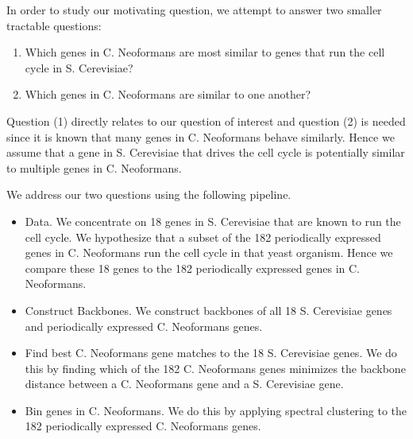 In order to study our motivating question, we attempt to answer two smaller tractable questions: 
\begin{enumerate}
\item Which genes in C. Neoformans are most similar to genes that run the cell cycle in S. Cerevisiae? 
\item Which genes in C. Neoformans are similar to one another? 
\end{enumerate}

Question (1) directly relates to our question of interest and question (2) is needed since it is known that many genes in C. Neoformans behave similarly. Hence we assume that a gene in S. Cerevisiae that drives the cell cycle is potentially similar to multiple genes in C. Neoformans. 

 We address our two questions using the following pipeline. 
\begin{itemize}
\item Data. We concentrate on 18 genes in S. Cerevisiae that are known to run the cell cycle. We hypothesize that a subset of the 182 periodically expressed genes in C. Neoformans run the cell cycle in that yeast organism. Hence we compare these 18 genes to the 182 periodically expressed genes in C. Neoformans.
\item Construct Backbones. We construct backbones of all 18 S. Cerevisiae genes and periodically expressed C. Neoformans genes. 
\item Find best C. Neoformans gene matches to the 18 S. Cerevisiae genes.  We do this by finding which of the 182 C. Neoformans genes minimizes the backbone distance between a C. Neoformans gene and a S. Cerevisiae gene.
\item Bin genes in C. Neoformans. We do this by applying spectral clustering to the 182 periodically expressed C. Neoformans genes.
\end{itemize}

